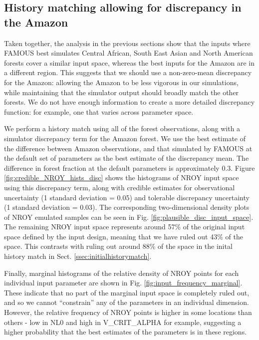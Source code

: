 \documentclass[esd, article]{copernicus} %
\begin{document}
\subsection{History matching allowing for discrepancy in the Amazon}\label{ssec:hist_disc}

Taken together, the analysis in the previous sections show that the inputs where FAMOUS best simulates Central African, South East Asian and North American forests cover a similar input space, whereas the best inputs for the Amazon are in a different region. This suggests that we should use a non-zero-mean discrepancy for the Amazon: allowing the Amazon to be less vigorous in our simulations, while maintaining that the simulator output should broadly match the other forests. We do not have enough information to create a more detailed discrepancy function: for example, one that varies across parameter space.

We perform a history match using all of the forest observations, along with a simulator discrepancy term for the Amazon forest. We use the best estimate of the difference between Amazon observations, and that simulated by FAMOUS at the default set of parameters as the best estimate of the discrepancy mean. The difference in forest fraction at the default parameters is approximately 0.3. Figure \ref{fig:credible_NROY_hists_disc} shows the histograms of NROY input space using this discrepancy term, along with credible estimates for observational uncertainty (1 standard deviation = 0.05) and tolerable discrepancy uncertainty (1 standard deviation = 0.03). The corresponding two-dimensional density plots of NROY emulated samples can be seen in Fig.  \ref{fig:plausible_disc_input_space}. The remaining NROY input space represents around 57\% of the original input space defined by the input design, meaning that we have ruled out 43\% of the space. This contrasts with ruling out around 88\% of the space in the inital history match in Sect. \ref{ssec:initialhistorymatch}.

Finally, marginal histograms of the relative density of NROY points for each individual input parameter are shown in Fig.  \ref{fig:input_frequency_marginal}. These indicate that no part of the marginal input space is completely ruled out, and so we cannot ``constrain'' any of the parameters in an individual dimension. However, the relative frequency of NROY points is higher in some locations than others - low in NL0 and high in V\_CRIT\_ALPHA for example, suggesting a higher probability that the best estimates of the parameters is in these regions.
\end{document}
